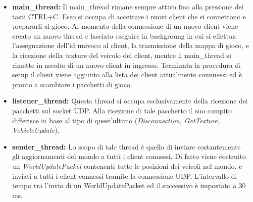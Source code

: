 \documentclass{article}
\begin{document}
\begin{itemize}
\item{\textbf{main\_thread:}}
Il main\_thread rimane sempre attivo fino alla pressione dei tasti CTRL+C. Esso si occupa di accettare i nuovi client che si connettono e prepararli al gioco. Al momento della connessione di un nuovo client viene creato un nuovo thread e lasciato eseguire in backgroung in cui si effettua l'assegnazione dell'id univoco al client, la trasmissione della mappa di gioco, e la ricezione della texture del veicolo del client, mentre il main\_thread si rimette in ascolto di un nuovo client in ingresso. Terminata la procedura di setup il client viene aggiunto alla lista dei client attualmente connnessi ed è pronto a scambiare i pacchetti di gioco.
\item{\textbf{listener\_thread:}}
Questo thread si occupa esclusivamente della ricezione dei pacchetti sul socket UDP. Alla ricezione di tale pacchetto il suo compito differisce in base al tipo di quest'ultimo (\textit{Disconnection, GetTexture, VehicleUpdate}).
\item{\textbf{sender\_thread:}}
Lo scopo di tale thread è quello di inviare costantemente gli aggiornamenti del mondo a tutti i client connessi. Di fatto viene costruito un \textit{WorldUpdatePacket} contenenti tutte le posizioni dei veicoli nel mondo, e inviati a tutti i client connessi tramite la connessione UDP. L'intervallo di tempo tra l'invio di un WorldUpdatePacket ed il successivo è impostato a 30 ms.
\end{itemize}
\end{document}

